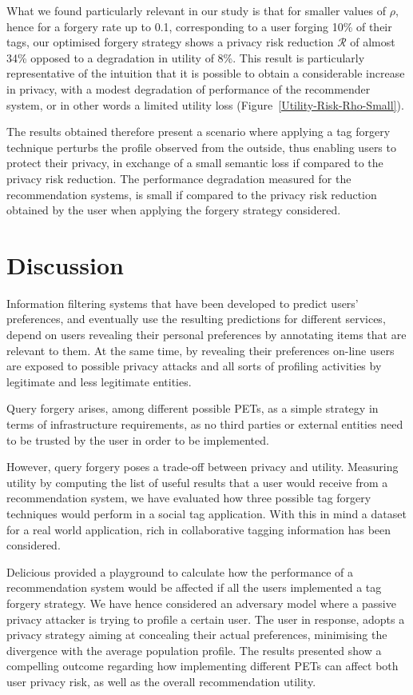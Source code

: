 What we found particularly relevant in our study is that for smaller values of $\rho$, hence for a forgery rate up to 0.1, corresponding to a user forging 10\% of their tags, our optimised forgery strategy shows a privacy risk reduction $\mathcal{R}$  of almost 34\% opposed to a degradation in utility of 8\%. This result is particularly representative of the intuition that it is possible to obtain a considerable increase in privacy, with a modest degradation of performance of the recommender system, or in other words a limited utility loss (Figure~\ref{Utility-Risk-Rho-Small}).

The results obtained therefore present a scenario where applying a tag forgery technique perturbs the profile observed from the outside, thus enabling users to protect their privacy, in exchange of a small semantic loss if compared to the privacy risk reduction. The performance degradation measured for the recommendation systems, is small if compared to the privacy risk reduction obtained by the user when applying the forgery strategy considered.

\section{Discussion}
\label{sec:discussion}
Information filtering systems that have been developed to predict users' preferences, and eventually use the resulting predictions for different services, depend on users revealing their personal preferences by annotating items that are relevant to them.  At the same time, by revealing their preferences on-line users are exposed to possible privacy attacks and all sorts of profiling activities by legitimate and less legitimate entities.

Query forgery arises, among different possible PETs, as a simple strategy in terms of infrastructure requirements, as no third parties or external entities need to be trusted by the user in order to be implemented.

However, query forgery poses a trade-off between privacy and utility. Measuring utility by computing the list of useful results that a user would receive from a recommendation system, we have evaluated how three possible tag forgery techniques would perform in a social tag application. With this in mind a dataset for a real world application, rich in collaborative tagging information has been considered.

Delicious provided a playground to calculate how the performance of a recommendation system would be affected if all the users implemented a tag forgery strategy. We have hence considered an adversary model where a passive privacy attacker is trying to profile a certain user. The user in response, adopts a privacy strategy aiming at concealing their actual preferences, minimising the divergence with the average population profile. The results presented show a compelling outcome regarding  how implementing different PETs can affect both user privacy risk, as well as the overall recommendation utility.

